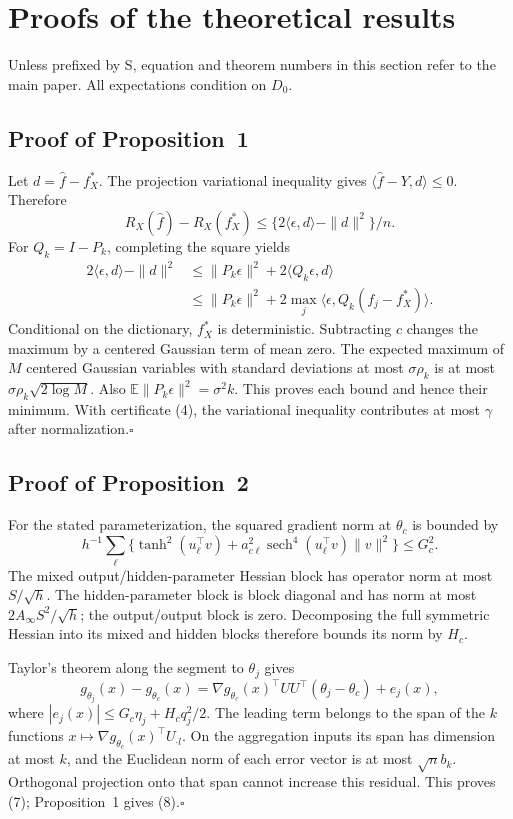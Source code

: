 \documentclass[pdflatex,sn-mathphys-ay]{sn-jnl}
\theoremstyle{remark}\newtheorem{remark}[theorem]{Remark}
\newcommand{\E}{\mathbb E}
\begin{document}
\section{Proofs of the theoretical results}
Unless prefixed by S, equation and theorem numbers in this section refer to the main paper. All expectations condition on $D_0$.
\subsection{Proof of Proposition~1}
Let $d=\hat f-f_X^*$. The projection variational inequality gives $\langle\hat f-Y,d\rangle\leq0$. Therefore
\begin{equation}
 R_X(\hat f)-R_X(f_X^*)\leq
 \{2\langle\epsilon,d\rangle-\|d\|^2\}/n.
\end{equation}
For $Q_k=I-P_k$, completing the square yields
\begin{align*}
 2\langle\epsilon,d\rangle-\|d\|^2
 &\leq\|P_k\epsilon\|^2+2\langle Q_k\epsilon,d\rangle\\
 &\leq\|P_k\epsilon\|^2+
 2\max_j\langle\epsilon,Q_k(f_j-f_X^*)\rangle.
\end{align*}
Conditional on the dictionary, $f_X^*$ is deterministic. Subtracting $c$ changes the maximum by a centered Gaussian term of mean zero. The expected maximum of $M$ centered Gaussian variables with standard deviations at most $\sigma\rho_k$ is at most $\sigma\rho_k\sqrt{2\log M}$. Also $\E\|P_k\epsilon\|^2=\sigma^2k$. This proves each bound and hence their minimum. With certificate (4), the variational inequality contributes at most $\gamma$ after normalization.\hfill$\square$

\subsection{Proof of Proposition~2}
For the stated parameterization, the squared gradient norm at $\theta_c$ is bounded by
\[
 h^{-1}\sum_\ell\{\tanh^2(u_\ell^\top v)
 +a_{c\ell}^2\operatorname{sech}^4(u_\ell^\top v)\|v\|^2\}
 \leq G_c^2.
\]
The mixed output/hidden-parameter Hessian block has operator norm at most $S/\sqrt h$. The hidden-parameter block is block diagonal and has norm at most $2A_\infty S^2/\sqrt h$; the output/output block is zero. Decomposing the full symmetric Hessian into its mixed and hidden blocks therefore bounds its norm by $H_c$.

Taylor's theorem along the segment to $\theta_j$ gives
\[
 g_{\theta_j}(x)-g_{\theta_c}(x)
 =\nabla g_{\theta_c}(x)^\top UU^\top(\theta_j-\theta_c)+e_j(x),
\]
where $|e_j(x)|\leq G_c\eta_j+H_cq_j^2/2$. The leading term belongs to the span of the $k$ functions $x\mapsto\nabla g_{\theta_c}(x)^\top U_{\cdot l}$. On the aggregation inputs its span has dimension at most $k$, and the Euclidean norm of each error vector is at most $\sqrt n b_k$. Orthogonal projection onto that span cannot increase this residual. This proves (7); Proposition~1 gives (8).\hfill$\square$
\end{document}
